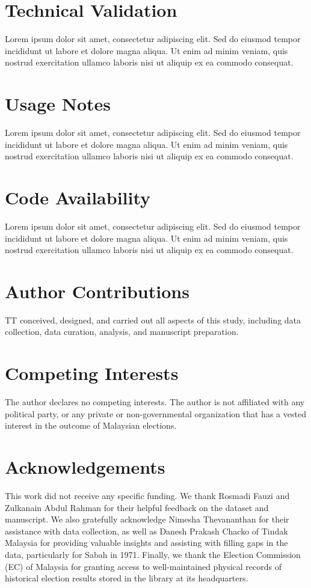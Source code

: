 \documentclass[11pt]{article}
\begin{document}
\section*{Technical Validation}
Lorem ipsum dolor sit amet, consectetur adipiscing elit. Sed do eiusmod tempor incididunt ut labore et dolore magna aliqua. Ut enim ad minim veniam, quis nostrud exercitation ullamco laboris nisi ut aliquip ex ea commodo consequat.

\section*{Usage Notes}
Lorem ipsum dolor sit amet, consectetur adipiscing elit. Sed do eiusmod tempor incididunt ut labore et dolore magna aliqua. Ut enim ad minim veniam, quis nostrud exercitation ullamco laboris nisi ut aliquip ex ea commodo consequat.

\section*{Code Availability}
Lorem ipsum dolor sit amet, consectetur adipiscing elit. Sed do eiusmod tempor incididunt ut labore et dolore magna aliqua. Ut enim ad minim veniam, quis nostrud exercitation ullamco laboris nisi ut aliquip ex ea commodo consequat.


\newpage

\begingroup
\raggedright
\let\oldthebibliography\thebibliography

\endgroup
\section*{Author Contributions}
TT conceived, designed, and carried out all aspects of this study, including data collection, data curation, analysis, and manuscript preparation.

\section*{Competing Interests}
The author declares no competing interests. The author is not affiliated with any political party, or any private or non-governmental organization that has a vested interest in the outcome of Malaysian elections.

\section*{Acknowledgements}
This work did not receive any specific funding. We thank Rosmadi Fauzi and Zulkanain Abdul Rahman for their helpful feedback on the dataset and manuscript. We also gratefully acknowledge Nimesha Thevananthan for their assistance with data collection, as well as Danesh Prakash Chacko of Tindak Malaysia for providing valuable insights and assisting with filling gaps in the data, particularly for Sabah in 1971. Finally, we thank the Election Commission (EC) of Malaysia for granting access to well-maintained physical records of historical election results stored in the library at its headquarters.
\end{document}
